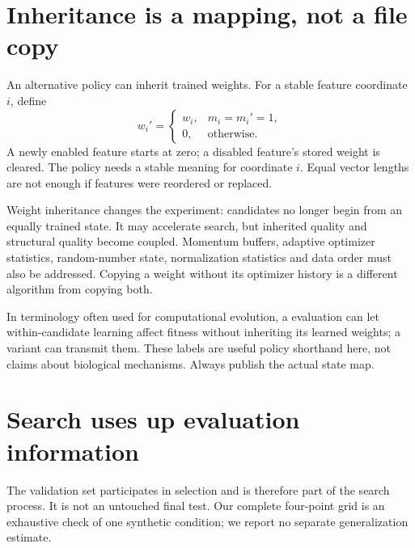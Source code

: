 \section{Inheritance is a mapping, not a file copy}
An alternative policy can inherit trained weights. For a stable feature
coordinate $i$, define
\begin{equation}
 w_i'=\begin{cases}
 w_i,&m_i=m_i'=1,\\
 0,&\text{otherwise}.
 \end{cases}
 \label{eq:inherit}
\end{equation}
A newly enabled feature starts at zero; a disabled feature's stored weight
is cleared. The policy needs a stable meaning for coordinate $i$.
Equal vector lengths are not enough if features were reordered or replaced.


Weight inheritance changes the experiment: candidates no longer begin
from an equally trained state. It may accelerate search, but inherited
quality and structural quality become coupled. Momentum buffers, adaptive
optimizer statistics, random-number state, normalization statistics and
data order must also be addressed. Copying a weight without its optimizer
history is a different algorithm from copying both.

In terminology often used for computational evolution, a 
evaluation can let within-candidate learning affect fitness without
inheriting its learned weights; a  variant can transmit them.
These labels are useful policy shorthand here, not claims about biological
mechanisms. Always publish the actual state map.

\section{Search uses up evaluation information}
The validation set participates in selection and is therefore part of
the search process. It is not an untouched final test. Our complete
four-point grid is an exhaustive check of one synthetic condition;
we report no separate generalization estimate.

